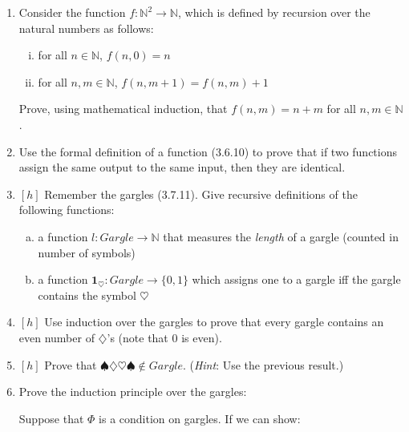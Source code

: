 \begin{enumerate}[\thesection.1]
		\item Consider the function $f:\mathbb{N}^2\to \mathbb{N}$, which is defined by recursion over the natural numbers as follows:
		\begin{enumerate}[(i)]
		
			\item for all $n\in\mathbb{N}$, $f(n,0)=n$
			
			\item for all $n,m\in\mathbb{N}$, $f(n,m+1)=f(n,m)+1$
		
		\end{enumerate}
		Prove, using mathematical induction, that $f(n,m)=n+ m$ for all $n,m\in\mathbb{N}$. 
							
		\item Use the formal definition of a function (3.6.10) to prove that if two functions assign the same output to the same input, then they are identical.

		\item $[h]$ Remember the gargles (3.7.11).  Give recursive definitions of the following functions:
				
					\begin{enumerate}[(a)]
								
						\item a function $l:Gargle\to\mathbb{N}$ that measures the \emph{length} of a gargle (counted in number of symbols)
				 
						\item a function $\mathbf{1}_\heartsuit:Gargle\to\{0,1\}$ which assigns one to a gargle iff the gargle contains the symbol $\heartsuit$
						
				
					\end{enumerate}
				
			\item $[h]$ Use induction over the gargles to prove that every gargle contains an even number of $\diamondsuit$'s (note that $0$ is even).
			
			\item $[h]$ Prove that $\spadesuit\diamondsuit\heartsuit\spadesuit\notin Gargle$. (\emph{Hint}: Use the previous result.)
					
			\item Prove the induction principle over the gargles:
			
			\begin{theorem}
			Suppose that $\Phi$ is a condition on gargles. If we can show:
			\begin{enumerate}
			

\end{enumerate}
\end{theorem}
\end{enumerate}
